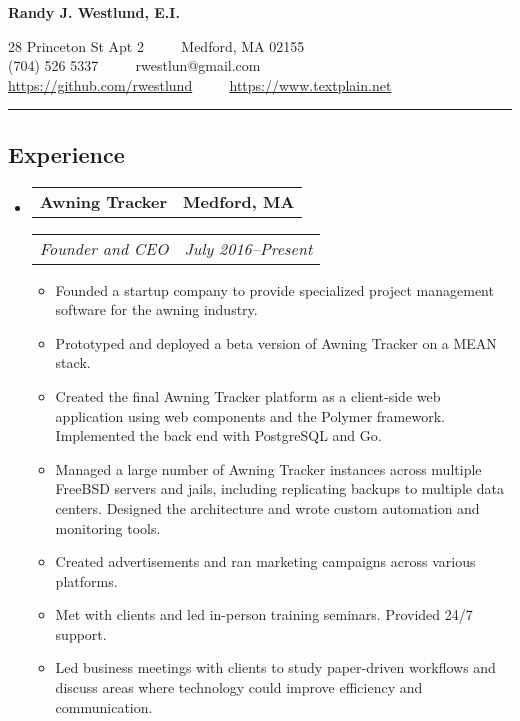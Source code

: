 \documentclass[10pt,letterpaper]{article}
\newcommand{\headerrow}[2]{%
    \begin{tabularx}{\linewidth}{Xr}
	    #1 & #2 \\
    \end{tabularx}
}
\begin{document}
\begin{center}
{\LARGE \textbf{Randy J. Westlund, E.I.}}

28 Princeton St Apt 2 \ \ \textbullet%
    \ \ Medford, MA 02155 \\
(704) 526 5337 \ \ \textbullet%
    \ \ rwestlun@gmail.com \\
\url{https://github.com/rwestlund} \ \ \textbullet%
    \ \ \url{https://www.textplain.net}
\end{center}

\vspace{2pt}
\hrule
\vspace{-0.4em}
\subsection*{Experience}
\begin{itemize}
	\parskip=0.1em

	\item
	\headerrow{\textbf{Awning Tracker}}{\textbf{Medford, MA}}
	\headerrow{\textit{Founder and CEO}}{\textit{July 2016--Present}}
	\begin{itemize}
        \item Founded a startup company to provide specialized project
            management software for the awning industry.

        \item Prototyped and deployed a beta version of Awning Tracker on a
            MEAN stack.

        \item Created the final Awning Tracker platform as a client-side web
            application using web components and the Polymer framework.
            Implemented the back end with PostgreSQL and Go.

        \item Managed a large number of Awning Tracker instances across
            multiple FreeBSD servers and jails, including replicating backups
            to multiple data centers.  Designed the architecture and wrote
            custom automation and monitoring tools.

        \item Created advertisements and ran marketing campaigns across various
            platforms.

        \item Met with clients and led in-person training seminars.  Provided
            24/7 support.

        \item Led business meetings with clients to study paper-driven
            workflows and discuss areas where technology could improve
            efficiency and communication.
	\end{itemize}


\end{itemize}
\end{document}
